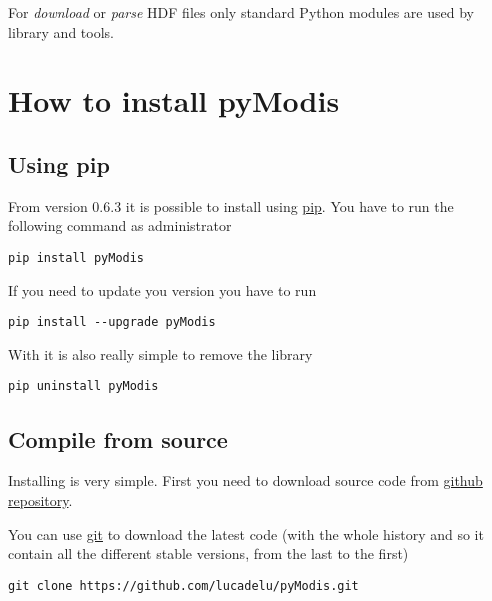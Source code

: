 \documentclass[a4paper,11pt,oneside]{sphinxmanual}
\begin{document}
For \emph{download} or \emph{parse} HDF files only standard Python modules are used
by  library and tools.


\section{How to install pyModis}
\label{info:how-to-install-pymodis}

\subsection{Using pip}
\label{info:using-pip}
From version 0.6.3 it is possible to install  using
\href{https://pypi.python.org/pypi/pip}{pip}. You have to run the following
command as administrator

\begin{Verbatim}[commandchars=\\\{\}]
pip install pyModis
\end{Verbatim}

If you need to update you  version you have to run

\begin{Verbatim}[commandchars=\\\{\}]
pip install --upgrade pyModis
\end{Verbatim}

With  it is also really simple to remove the library

\begin{Verbatim}[commandchars=\\\{\}]
pip uninstall pyModis
\end{Verbatim}


\subsection{Compile from source}
\label{info:compile-from-source}
Installing  is very simple. First you need to download 
source code from \href{https://github.com/lucadelu/pyModis}{github repository}.

You can use \href{http://git-scm.com/}{git} to download the latest code
(with the whole history and so it contain all the different stable versions,
from the last to the first)

\begin{Verbatim}[commandchars=\\\{\}]
git clone https://github.com/lucadelu/pyModis.git
\end{Verbatim}
\end{document}

